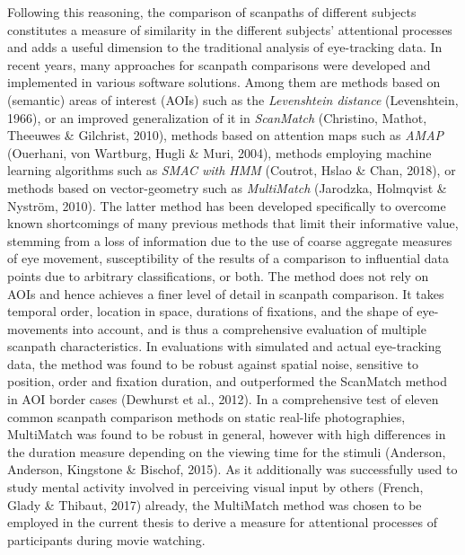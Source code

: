 \documentclass[a4paper, 12pt]{scrreprt}
\begin{document}
Following this reasoning, the comparison of scanpaths of different subjects constitutes a measure of similarity in the different subjects’ attentional processes and adds a useful dimension to the traditional analysis of eye-tracking data. In recent years, many approaches for scanpath comparisons were developed and implemented in various software solutions. Among them are methods based on (semantic) areas of interest (AOIs) such as the \textit{Levenshtein distance} (Levenshtein, 1966), or an improved generalization of it in \textit{ScanMatch} (Christino, Mathot, Theeuwes \& Gilchrist, 2010), methods based on attention maps such as \textit{AMAP} (Ouerhani, von Wartburg, Hugli \& Muri, 2004), methods employing machine learning algorithms such as \textit{SMAC with HMM} (Coutrot, Hslao \& Chan, 2018), or methods based on vector-geometry such as \textit{MultiMatch} (Jarodzka, Holmqvist \& Nyström, 2010). The latter method has been developed specifically to overcome known shortcomings of many previous methods that limit their informative value, stemming from a loss of information due to the use of coarse aggregate measures of eye movement, susceptibility of the results of a comparison to influential data points due to arbitrary classifications, or both. The method does not rely on AOIs and hence achieves a finer level of detail in scanpath comparison. It takes temporal order, location in space, durations of fixations, and the shape of eye-movements into account, and is thus a comprehensive evaluation of multiple scanpath characteristics. In evaluations with simulated and actual eye-tracking data, the method was found to be robust against spatial noise, sensitive to position, order and fixation duration, and outperformed the ScanMatch method in AOI border cases (Dewhurst et al., 2012). In a comprehensive test of eleven common scanpath comparison methods on static real-life photographies, MultiMatch was found to be robust in general, however with high differences in the duration measure depending on the viewing time for the stimuli (Anderson, Anderson, Kingstone \& Bischof, 2015). As it additionally was successfully used to study mental activity involved in perceiving visual input by others (French, Glady \& Thibaut, 2017) already, the MultiMatch method was chosen to be employed in the current thesis to derive a measure for attentional processes of participants during movie watching. 
\end{document}
